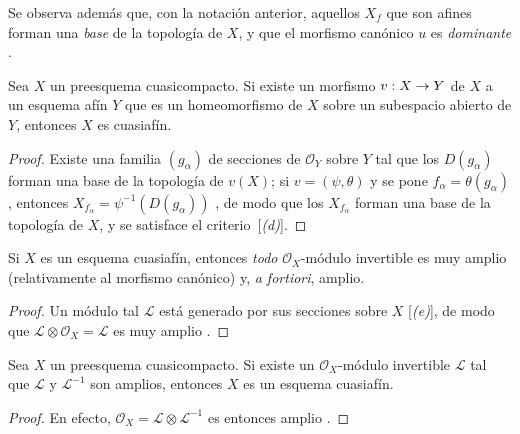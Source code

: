 \documentclass[oneside,10pt]{amsart}
\makeatletter
\newcommand{\ega@arrow}[2]{\mathchoice{#1}{#2}{#2}{#2}}
\renewcommand{\to}{\ega@arrow{\longrightarrow}{\rightarrow}}
\let\EGAOriginalLabel\label
\renewcommand{\label}[1]{\phantomsection\EGAOriginalLabel{#1}}
\makeatother
\begin{document}
Se observa además que, con la notación anterior, aquellos $X_f$ que son afines forman una \emph{base} de la topología de $X$, y que el morfismo canónico $u$ es \emph{dominante} .

\begin{corollary}[5.1.3]
\label{II.5.1.3-fr}
Sea $X$ un preesquema cuasicompacto.
Si existe un morfismo $v:X\to Y$ de $X$ a un esquema afín $Y$ que es un homeomorfismo de $X$ sobre un subespacio abierto de $Y$, entonces $X$ es cuasiafín.
\end{corollary}

\begin{proof}
Existe una familia $(g_\alpha)$ de secciones de $\mathcal{O}_Y$ sobre $Y$ tal que los $D(g_\alpha)$ forman una base de la topología de $v(X)$;
si $v=(\psi,\theta)$ y se pone $f_\alpha=\theta(g_\alpha)$, entonces $X_{f_\alpha}=\psi^{-1}(D(g_\alpha))$ , de modo que los $X_{f_\alpha}$ forman una base de la topología de $X$, y se satisface el criterio~[\emph{(d)}].
\end{proof}

\begin{corollary}[5.1.4]
\label{II.5.1.4-fr}
Si $X$ es un esquema cuasiafín, entonces \emph{todo} $\mathcal{O}_X$-módulo invertible es muy amplio (relativamente al morfismo canónico) y, \emph{a fortiori}, amplio.
\end{corollary}

\begin{proof}
Un módulo tal $\mathcal{L}$ está generado por sus secciones sobre $X$ [\emph{(e)}], de modo que $\mathcal{L}\otimes\mathcal{O}_X=\mathcal{L}$ es muy amplio .
\end{proof}

\begin{corollary}[5.1.5]
\label{II.5.1.5-fr}
Sea $X$ un preesquema cuasicompacto.
Si existe un $\mathcal{O}_X$-módulo invertible $\mathcal{L}$ tal que $\mathcal{L}$ y $\mathcal{L}^{-1}$ son amplios, entonces $X$ es un esquema cuasiafín.
\end{corollary}

\begin{proof}
En efecto, $\mathcal{O}_X=\mathcal{L}\otimes\mathcal{L}^{-1}$ es entonces amplio .
\end{proof}
\end{document}
